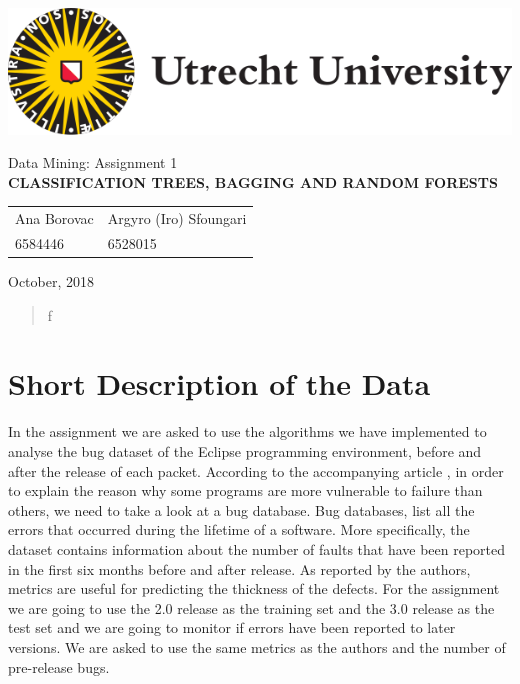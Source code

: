 \documentclass[a4paper,11pt]{article}
\begin{document}
\thispagestyle{empty}

\includegraphics[scale=0.35]{UUlogo.png}

\vspace{40mm}

\begin{center}
\begin{large}
Data Mining: Assignment 1 \\[3mm]
\textbf{
\uppercase{Classification Trees, Bagging and Random Forests}} \\[20mm]
\end{large}

\begin{tabularx}{\textwidth}{YY}
Ana Borovac & Argyro (Iro) Sfoungari \\
6584446 & 6528015
\end{tabularx}
\end{center}

\vfill

October, 2018

\newpage

\tableofcontents

\begin{abstract}
f
\end{abstract}

\section{Short Description of the Data}
 In the assignment we are asked to use the algorithms we have implemented to analyse the bug dataset of the Eclipse programming environment, before and after the release of each packet. According to the accompanying article \cite{article}, in order to explain the reason why some programs are more vulnerable to failure than others, we need to take a look at a bug database. Bug databases, list all the errors that occurred during the lifetime of a software. More specifically, the dataset contains information about the number of faults that have been reported in the first six months before and after release. As reported by the authors, metrics are useful for predicting the thickness of the defects. For the assignment we are going to use the 2.0 release as the training set and the 3.0 release as the test set and we are going to monitor if errors have been reported to later versions. We are asked to use the same metrics as the authors and the number of pre-release bugs. 
 
\end{document}
